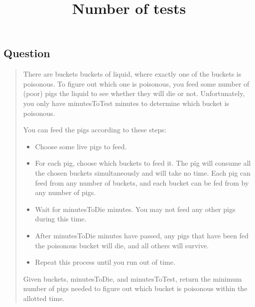 \documentclass[a4,10pt]{article}
\title{Number of tests}
\date{}%
\begin{document}
\maketitle
\subsection*{Question}
\begin{quote}
There are buckets buckets of liquid, where exactly one of the buckets is poisonous. To figure out which one is poisonous, you feed some number of (poor) pigs the liquid to see whether they will die or not. Unfortunately, you only have minutesToTest minutes to determine which bucket is poisonous.
\par
You can feed the pigs according to these steps:
\begin{itemize}
\item    Choose some live pigs to feed.
\item    For each pig, choose which buckets to feed it. The pig will consume all the chosen buckets simultaneously and will take no time. Each pig can feed from any number of buckets, and each bucket can be fed from by any number of pigs.
\item    Wait for minutesToDie minutes. You may not feed any other pigs during this time.
\item    After minutesToDie minutes have passed, any pigs that have been fed the poisonous bucket will die, and all others will survive.
\item    Repeat this process until you run out of time.
\end{itemize}
Given buckets, minutesToDie, and minutesToTest, return the minimum number of pigs needed to figure out which bucket is poisonous within the allotted time.
\par
 


\end{quote}
\end{document}

